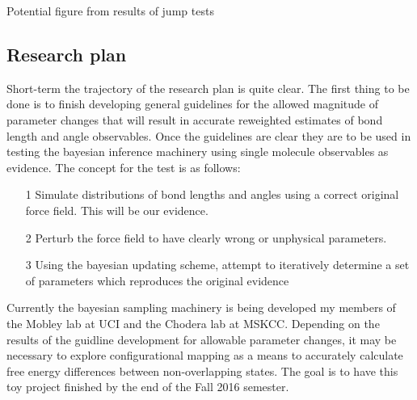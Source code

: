 \documentclass[rmp,nofootinbib,superscriptaddress,12pt,tightenlines,notitlepage]{revtex4-1}
\begin{document}
Potential figure from results of jump tests


\subsection{Research plan}
Short-term the trajectory of the research plan is quite clear. The first thing to be done is to finish developing general guidelines for the allowed magnitude
of parameter changes that will result in accurate reweighted estimates of bond length and angle observables. Once the guidelines are clear they are to be 
used in testing the bayesian inference machinery using single molecule observables as evidence. The concept for the test is as follows:
\begin{itemize}
 \item [1] Simulate distributions of bond lengths and angles using a correct original force field. This will be our evidence.
 \item [2] Perturb the force field to have clearly wrong or unphysical parameters.
 \item [3] Using the bayesian updating scheme, attempt to iteratively determine a set of parameters which reproduces the original evidence
\end{itemize}
Currently the bayesian sampling machinery is being developed my members of the Mobley lab at UCI and the Chodera lab at MSKCC. Depending on the results of the
guidline development for allowable parameter changes, it may be necessary to explore configurational mapping as a means to accurately calculate free energy differences between non-overlapping states.\cite{mapping} The goal is to have this toy project finished by the end of the Fall 2016 semester. 
\end{document}
